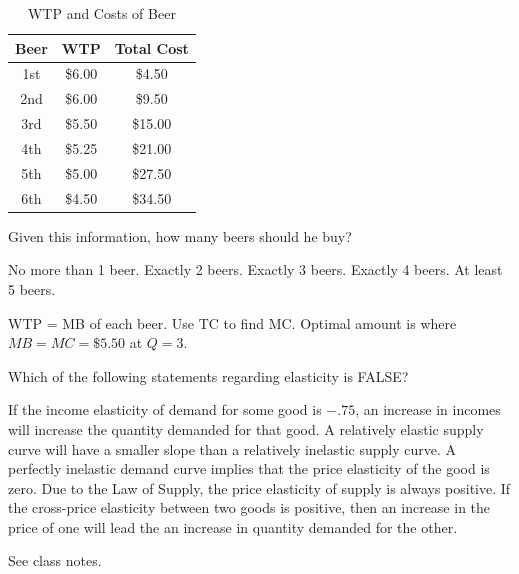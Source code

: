 \documentclass[addpoints,11pt]{exam}
\theoremstyle{definition}
\begin{document}
\begin{questions}
	\begin{table}[h!]
		\caption{WTP and Costs of Beer}
		\label{tab5}
		\centering
		\begin{tabular}{ c|c|c} 
			
			Beer & WTP & Total Cost \\
			\hline
			1st & \$6.00 & \$4.50  \\
			2nd & \$6.00 & \$9.50 \\
			3rd & \$5.50 & \$15.00 \\
			4th & \$5.25 & \$21.00\\
			5th & \$5.00 & \$27.50  \\
			6th & \$4.50 & \$34.50 \\
		\end{tabular}
	\end{table}
	
Given this information, how many beers should he buy?
	
\begin{choices}
\choice No more than 1 beer.
\choice Exactly 2 beers.
\CorrectChoice Exactly 3 beers.
\choice Exactly 4 beers.
\choice At least 5 beers.
\end{choices}

\begin{solution}
WTP = MB of each beer. Use TC to find MC. Optimal amount is where $MB = MC =\$5.50$ at $Q=3$.
\end{solution} 

\newpage

\question Which of the following statements regarding elasticity is FALSE?

\begin{choices}
\CorrectChoice If the income elasticity of demand for some good is $-.75$, an increase in incomes will increase the quantity demanded for that good.
\choice A relatively elastic supply curve will have a smaller slope than a relatively inelastic supply curve.
\choice A perfectly inelastic demand curve implies that the price elasticity of the good is zero.
\choice Due to the Law of Supply, the price elasticity of supply is always positive.
\choice If the cross-price elasticity between two goods is positive, then an increase in the price of one will lead the an increase in quantity demanded for the other.
\end{choices} 

\begin{solution}
See class notes.
\end{solution}


\end{questions}
\end{document}
